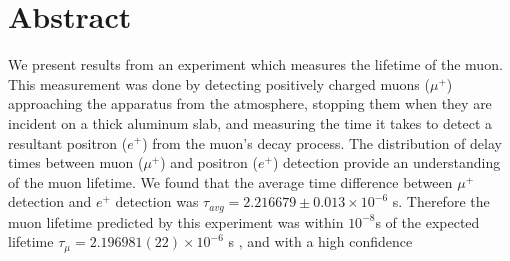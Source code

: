 
\section*{Abstract}  
We present results from an experiment which measures the lifetime of the muon. This measurement was done by detecting positively charged muons ($\mu^+$) approaching the apparatus from the atmosphere, stopping them when they are incident on a thick aluminum slab, and measuring the time it takes to detect a resultant positron ($e^+$) from the muon's decay process. The distribution of delay times between muon ($\mu^+$) and positron ($e^+$) detection provide an understanding of the muon lifetime. We found that the average time difference between $\mu^+$ detection and $e^+$ detection was $\tau_{avg} = 2.216679 \pm 0.013 \times 10^{-6}$ s. Therefore the muon lifetime predicted by this experiment was within $10^{-8}$s of the expected lifetime \mbox{$\tau_\mu = 2.196981(22) \times 10^{-6}$} s \cite{ber}\cite{pat}, and with a high confidence 
